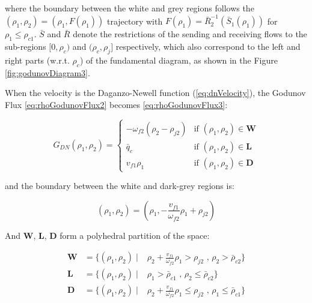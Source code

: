 \documentclass[11pt]{article}
\numberwithin{equation}{section}
\numberwithin{figure}{section}
\numberwithin{table}{section}
\begin{document}
\noindent where the boundary between the white and grey regions follows the $(\rho_{1},\rho_{2})=(\rho_{1},F(\rho_{1}))$ trajectory with $F(\rho_{1})= \bar{R}^{-1}_{2}(\bar{S}_{1}(\rho_{1}))$ for $\rho_{1} \leq \rho_{c1}$. $\bar{S}$ and $\bar{R}$ denote the restrictions of the sending and receiving flows to the sub-regions $[0,\rho_{c})$ and $(\rho_{c},\rho_{j}]$ respectively, which also correspond to the left and right parts (w.r.t. $\rho_{c}$) of the fundamental diagram, as shown in the Figure \ref{fig:godunovDiagram3}.

\noindent When the velocity is the Daganzo-Newell function (\ref{eq:dnVelocity}), the Godunov Flux \ref{eq:rhoGodunovFlux2} becomes \ref{eq:rhoGodunovFlux3}:

\begin{equation} \label{eq:rhoGodunovFlux3a}
G_{DN}(\rho_{1},\rho_{2}) = \begin{cases}
-\omega_{f2} \left( \rho_{2} - \rho_{j2} \right) & \text{if } (\rho_{1},\rho_{2}) \in \textbf{W}\\
\bar{q}_{c} & \text{if } (\rho_{1},\rho_{2}) \in \textbf{L}\\
v_{f1} \rho_{1} & \text{if } (\rho_{1},\rho_{2}) \in \textbf{D}
\end{cases}
\end{equation}

\noindent and the boundary between the white and dark-grey regions is:

\begin{equation} \label{eq:boundaryHetero}
(\rho_{1},\rho_{2})=(\rho_{1},-\frac{v_{f1}}{\omega_{f2}}\rho_{1}+\rho_{j2})
\end{equation}

\noindent And \textbf{W}, \textbf{L}, \textbf{D} form a polyhedral partition of the space:

\begin{equation}
\begin{array}{lll}
\textbf{W} & = \{(\rho_{1},\rho_{2}) \mid & \rho_{2} + \frac{v_{f1}}{\omega_{f2}}\rho_{1} > \rho_{j2} \text{ ,   } \rho_{2} > \bar{\rho}_{c2}\}\\
\textbf{L} & = \{(\rho_{1},\rho_{2}) \mid & \rho_{1} > \bar{\rho}_{c1} \text{ ,   } \rho_{2} \leq \bar{\rho}_{c2}\}\\
\textbf{D} & = \{(\rho_{1},\rho_{2}) \mid & \rho_{2} + \frac{v_{f1}}{\omega_{f2}}\rho_{1} \leq \rho_{j2} \text{ ,   } \rho_{1} \leq \bar{\rho}_{c1}\}
\end{array}
\label{eq:regions4}
\end{equation}
\end{document}
